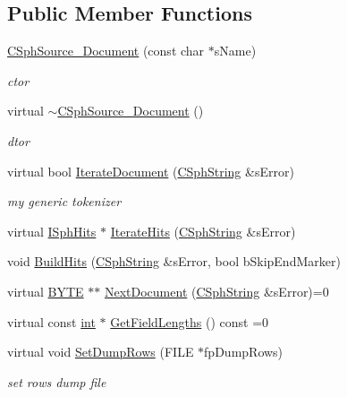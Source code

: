 \subsection*{Public Member Functions}
\begin{DoxyCompactItemize}
\item 
\hyperlink{classCSphSource__Document_a1f58374ec4997aee9fd15587a97d0243}{C\-Sph\-Source\-\_\-\-Document} (const char $\ast$s\-Name)
\begin{DoxyCompactList}\small\item\em ctor \end{DoxyCompactList}\item 
virtual \hyperlink{classCSphSource__Document_a387bf0019067f2ce1c28449b128f8cf1}{$\sim$\-C\-Sph\-Source\-\_\-\-Document} ()
\begin{DoxyCompactList}\small\item\em dtor \end{DoxyCompactList}\item 
virtual bool \hyperlink{classCSphSource__Document_a6cdbf8ff1decc25937f95b4cce51b712}{Iterate\-Document} (\hyperlink{structCSphString}{C\-Sph\-String} \&s\-Error)
\begin{DoxyCompactList}\small\item\em my generic tokenizer \end{DoxyCompactList}\item 
virtual \hyperlink{classISphHits}{I\-Sph\-Hits} $\ast$ \hyperlink{classCSphSource__Document_afd28acf082b0c95a0e65f3299890bf45}{Iterate\-Hits} (\hyperlink{structCSphString}{C\-Sph\-String} \&s\-Error)
\item 
void \hyperlink{classCSphSource__Document_a5fc90bba959bb73d355b40bc721c75fd}{Build\-Hits} (\hyperlink{structCSphString}{C\-Sph\-String} \&s\-Error, bool b\-Skip\-End\-Marker)
\item 
virtual \hyperlink{sphinxstd_8h_a4ae1dab0fb4b072a66584546209e7d58}{B\-Y\-T\-E} $\ast$$\ast$ \hyperlink{classCSphSource__Document_a09f4bb163daef06a29a72387e0796d5a}{Next\-Document} (\hyperlink{structCSphString}{C\-Sph\-String} \&s\-Error)=0
\item 
virtual const \hyperlink{sphinxexpr_8cpp_a4a26e8f9cb8b736e0c4cbf4d16de985e}{int} $\ast$ \hyperlink{classCSphSource__Document_a0cd72b8587d98e306ff2f2e3d07503bb}{Get\-Field\-Lengths} () const =0
\item 
virtual void \hyperlink{classCSphSource__Document_a5ad504e9e2723ca1347736fd4b742397}{Set\-Dump\-Rows} (F\-I\-L\-E $\ast$fp\-Dump\-Rows)
\begin{DoxyCompactList}\small\item\em set rows dump file \end{DoxyCompactList}\item 
$$
\end{DoxyCompactItemize}
